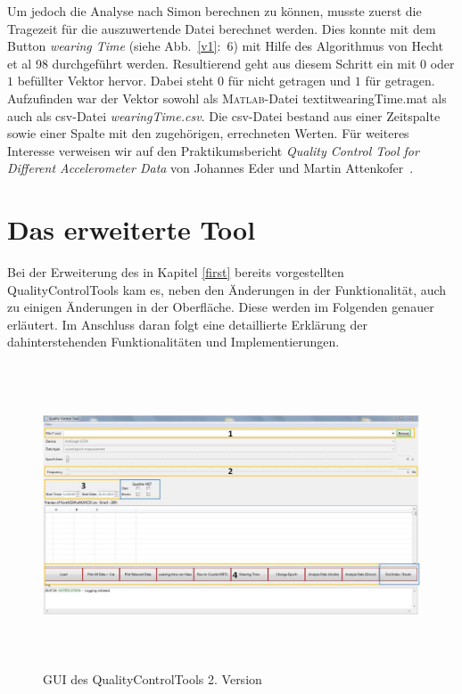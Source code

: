 \documentclass[onecolumn,german]{article}
\begin{document}
Um jedoch die Analyse nach Simon berechnen zu können, musste zuerst die Tragezeit für die auszuwertende Datei berechnet werden. Dies konnte mit dem Button \textit{wearing Time} (siehe Abb.~\ref{v1}:~6) mit Hilfe des Algorithmus von Hecht et al 98 \cite{idp} durchgeführt werden. Resultierend geht aus diesem Schritt ein mit $0$ oder $1$ befüllter Vektor hervor. Dabei steht $0$ für nicht getragen und $1$ für getragen. Aufzufinden war der Vektor sowohl als \mbox{\textsc{Matlab}-Datei} \mbox{textit{wearingTime.mat}} als auch als csv-Datei \mbox{\textit{wearingTime.csv}}. Die csv-Datei bestand aus einer Zeitspalte sowie einer Spalte mit den zugehörigen, errechneten Werten.\newline
\newpage
Für weiteres Interesse verweisen wir auf den Praktikumsbericht \textit{Quality Control Tool for Different Accelerometer Data} von Johannes Eder und Martin Attenkofer~\cite{idp}.


\newpage
\section{Das erweiterte Tool}
\label{v2_tool}

Bei der Erweiterung des in Kapitel \ref{first} bereits vorgestellten QualityControlTools kam es, neben den Änderungen in der Funktionalität, auch zu einigen Änderungen in der Oberfläche. Diese werden im Folgenden genauer erläutert. Im Anschluss daran folgt eine detaillierte Erklärung der dahinterstehenden Funktionalitäten und Implementierungen.

\begin{figure}[H]
\centerline{
\includegraphics[width=150mm, height=90mm]{Abbildungen/ErweitertesTool1.JPG}
}
\caption {GUI des QualityControlTools 2. Version}
\label{v2}
\end{figure}
\end{document}

